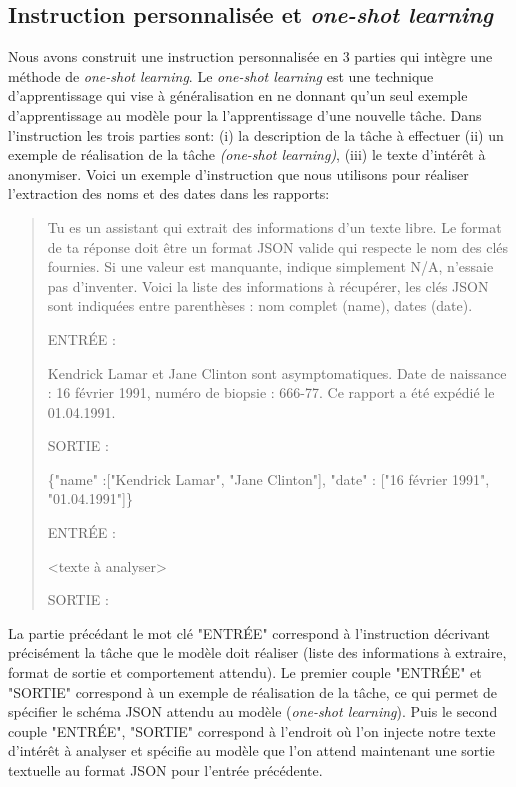 \subsection{Instruction personnalisée et \textit{one-shot learning}}
Nous avons construit une instruction personnalisée en 3 parties qui intègre une méthode de \textit{one-shot learning}. Le \textit{one-shot learning} est une technique d'apprentissage qui vise à généralisation en ne donnant qu'un seul exemple d'apprentissage au modèle pour la l'apprentissage d'une nouvelle tâche. Dans l'instruction les trois parties sont: (i) la description de la tâche à effectuer (ii) un exemple de réalisation de la tâche \textit{(one-shot learning)}, (iii) le texte d'intérêt à anonymiser.
Voici un exemple d'instruction que nous utilisons pour réaliser l'extraction des noms et des dates dans les rapports:
\begin{quote}
Tu es un assistant qui extrait des informations d'un texte libre. Le format de ta réponse doit être un format JSON valide qui respecte le nom des clés fournies. Si une valeur est manquante, indique simplement N/A, n'essaie pas d'inventer. Voici la liste des informations à récupérer, les clés JSON sont indiquées entre parenthèses : nom complet (name), dates (date).

ENTRÉE :

Kendrick Lamar et Jane Clinton sont asymptomatiques. Date de naissance : 16 février 1991, numéro de biopsie : 666-77. Ce rapport a été expédié le 01.04.1991.

SORTIE :

\{"name" :["Kendrick Lamar", "Jane Clinton"], "date" : ["16 février 1991", "01.04.1991"]\}

ENTRÉE :

<texte à analyser>

SORTIE :
\end{quote}

La partie précédant le mot clé "ENTRÉE" correspond à l'instruction décrivant précisément la tâche que le modèle doit réaliser (liste des informations à extraire, format de sortie et comportement attendu). Le premier couple "ENTRÉE" et "SORTIE" correspond à un exemple de réalisation de la tâche, ce qui permet de spécifier le schéma JSON attendu au modèle (\textit{one-shot learning}). Puis le second couple "ENTRÉE", "SORTIE" correspond à l'endroit où l'on injecte notre texte d'intérêt à analyser et spécifie au modèle que l'on attend maintenant une sortie textuelle au format JSON pour l'entrée précédente.

